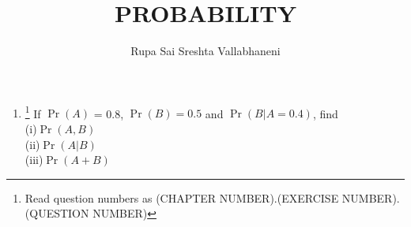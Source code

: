 \documentclass{article}
\providecommand{\pr}[1]{\ensuremath{\Pr\left(#1\right)}}
\begin{document}
\title{PROBABILITY}
\author{\Large Rupa Sai Sreshta Vallabhaneni}
\date{}

\maketitle
\begin{enumerate}[label=13.\arabic{enumi}.\arabic{enumii}]%
\setcounter{enumi}{0}
\setcounter{enumii}{3}

\item \footnote{Read question numbers as (CHAPTER NUMBER).(EXERCISE NUMBER).(QUESTION NUMBER)}  If $\pr{A}$ = 0.8, $\pr{B} = 0.5$ and $\pr{B \vert A = 0.4}$, find  \\
(i)$\pr{A,B}$ 
\\
 (ii)$\pr{A \vert B}$
\\
 (iii)$\pr{A+B}$
\\[1ex]


\end{enumerate}
\end{document}
